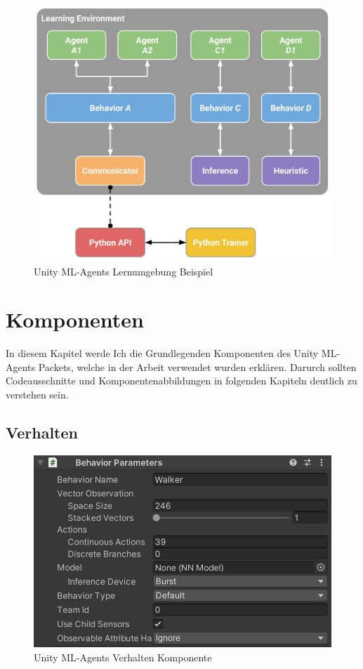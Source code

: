 \begin{figure}[H]
  \centering  
  \includegraphics[scale=0.3]{img/learning_environment_example.png}
  \caption{Unity ML-Agents Lernumgebung Beispiel \protect\cite{unity_mlagents_learning_environment_example}}
  \label{fig:learning_environment_example}
\end{figure}

\section{Komponenten}
In diesem Kapitel werde Ich die Grundlegenden Komponenten des Unity ML-Agents Packets, welche in der Arbeit verwendet wurden erklären. Darurch sollten Codeausschnitte und Komponentenabbildungen in folgenden Kapiteln deutlich zu verstehen sein.

\subsection{Verhalten}
\begin{figure}[H]
  \centering  
  \includegraphics[scale=0.5]{img/verhalten_komponente.png}
  \caption{Unity ML-Agents Verhalten Komponente}
  \label{fig:verhalten_komponente}
\end{figure}

